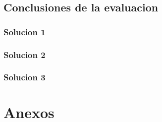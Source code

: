 \documentclass[a4paper,11pt]{article}
\begin{document}
\subsection{Conclusiones de la evaluacion}
\subsubsection{Solucion 1}
\subsubsection{Solucion 2}
\subsubsection{Solucion 3}



\section{Anexos}
\end{document}

